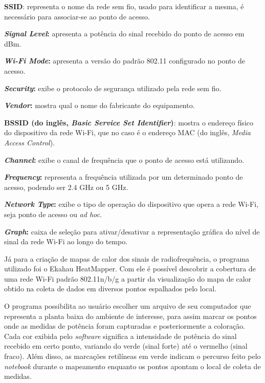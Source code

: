 \begin{compactitem}
	\item \textbf{SSID}: representa o nome da rede sem fio, usado para identificar a mesma, é necessário para associar-se ao ponto de acesso.
	\item \textbf{\textit{Signal Level}:} apresenta a potência do sinal recebido do ponto de acesso em dBm.
	\item \textbf{\textit{Wi-Fi Mode}:} apresenta a versão do padrão 802.11 configurado no ponto de acesso.
	\item \textbf{\textit{Security}:} exibe o protocolo de segurança utilizado pela rede sem fio.
	\item \textbf{\textit{Vendor}:} mostra qual o nome do fabricante do equipamento.
	\item \textbf{BSSID (do inglês, \textit{Basic Service Set Identifier})}: mostra o endereço físico do dispositivo da rede Wi-Fi, que no caso é o endereço MAC (do inglês, \textit{Media Access Control}).
	\item \textbf{\textit{Channel}:} exibe o canal de frequência que o ponto de acesso está utilizando.
	\item \textbf{\textit{Frequency}:} representa a frequência utilizada por um determinado ponto de acesso, podendo ser 2.4 GHz ou 5 GHz.
	\item \textbf{\textit{Network Type}:} exibe o tipo de operação do dispositivo que opera a rede Wi-Fi, seja ponto de acesso ou \textit{ad hoc}.
	\item \textbf{\textit{Graph}:} caixa de seleção para ativar/desativar a representação gráfica do nível de sinal da rede Wi-Fi ao longo do tempo.
\end{compactitem}
	
Já para a criação de mapas de calor dos sinais de radiofrequência, o programa utilizado foi o Ekahau HeatMapper. Com ele é possível descobrir a cobertura de uma rede Wi-Fi padrão 802.11n/b/g a partir da visualização do mapa de calor obtido na coleta de dados em diversos pontos espalhados pelo local.

O programa possibilita ao usuário escolher um arquivo de seu computador que representa a planta baixa do ambiente de interesse, para assim marcar os pontos onde as medidas de potência foram capturadas e posteriormente a coloração. Cada cor exibida pelo \textit{software} significa a intensidade de potência do sinal recebido em certo ponto, variando do verde (sinal forte) até o vermelho (sinal fraco). Além disso, as marcações retilíneas em verde indicam o percurso feito pelo \textit{notebook} durante o mapeamento enquanto os pontos apontam o local de coleta de medidas. %

